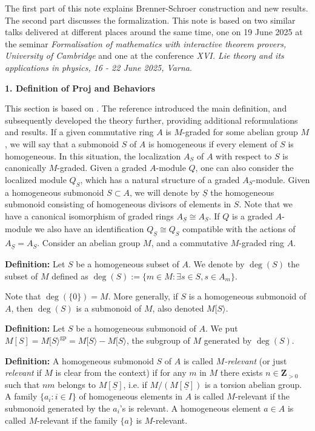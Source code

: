 \documentclass[graybox]{svmult}
\begin{document}
The first part of this note explains Brenner-Schroer construction and new results. The second part discusses the formalization. This note is based on two similar talks delivered at different places around the same time, one on 19 June 2025 at the seminar {\small \textit{Formalisation of mathematics with interactive theorem provers, University of Cambridge}} and one at the conference {\small \textit{XVI. Lie theory and its applications in physics, 16 - 22 June 2025, Varna}}.
\begin{flushleft}
\textbf{{1. Definition of Proj and Behaviors}}
\end{flushleft}
This section is based on \cite{MR24}. The reference \cite{BS03} introduced the main definition, and \cite{MR24} subsequently developed the theory further, providing additional reformulations and results.
If a given commutative ring $A$ is $M$-graded for some abelian group $M$, we will say that a submonoid $S$ of $A$ is homogeneous if every element of $S$ is homogeneous. 
In this situation, the localization $A_S$ of $A$ with respect to $S$ is canonically $M$-graded.
Given a graded $A$-module $Q$, one can also consider the localized module $Q_S$, which has a natural structure of a graded $A_S$-module.
Given a homogeneous submonoid $S \subset A$, we will denote by $\underline{S}$ the homogeneous submonoid consisting of homogeneous divisors of elements in $S$. Note that we have a canonical isomorphism of graded rings
 $A_{ \underline{S}} \cong A_{S}.
$
If $Q$ is a graded $A$-module we also have an identification
$
Q_{\underline{S}} \cong Q_S
$
compatible with the actions of $A_{ \underline{S}} = A_{S}$.
Consider an abelian group $M$, and a commutative $M$-graded ring $A$. 

\vspace{0.25\baselineskip}
\noindent \textbf{Definition:}
 Let $S$ be a homogeneous subset of $A$. We denote by $\deg(S)$ the subset of $M$ defined as 
$\deg(S):= \{ m \in M : \exists s \in S , s  \in A_m \}. $

 
Note that $\deg(\{0\})=M$.
More generally, if $S$ is a homogeneous submonoid of $A$, then $\deg(S)$ is a submonoid of $M$, also denoted $M[S\rangle$.

\vspace{0.25\baselineskip}
\noindent \textbf{{Definition:}}
Let $S$ be a homogeneous submonoid of $A$. 
 We put $M[S]=M[S \rangle^{\mathrm{gp}}= M[S \rangle- M[S \rangle$, the subgroup of $M$ generated by $\deg(S)$.


\vspace{0.25\baselineskip}
\noindent\textbf{{Definition:}}
 A homogeneous submonoid $S$ of $A$ is called \emph{$M$-relevant} (or just \emph{relevant} if $M$ is clear from the context) if for any $m$ in $M$ there exists $n \in \mathbf{Z}_{> 0}$ such that $nm$ belongs to $M[\underline{S}]$, i.e. if $M/(M[\underline{S}])$ is a torsion abelian group.
 A family $\{a_i : i \in I\}$ of homogeneous elements in $A$ is called $M$-relevant if the submonoid generated by the $a_i$'s is relevant.
 A homogeneous element $a \in A$ is called $M$-relevant if the family $\{a\}$ is $M$-relevant.
\end{document}
